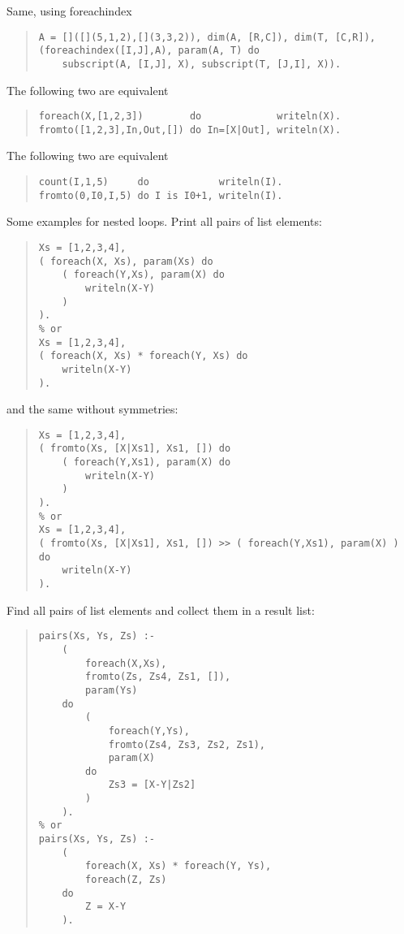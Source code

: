 Same, using foreachindex
\begin{quote}\begin{verbatim}
A = []([](5,1,2),[](3,3,2)), dim(A, [R,C]), dim(T, [C,R]),
(foreachindex([I,J],A), param(A, T) do
    subscript(A, [I,J], X), subscript(T, [J,I], X)).
\end{verbatim}\end{quote}

The following two are equivalent
\begin{quote}\begin{verbatim}
foreach(X,[1,2,3])        do             writeln(X).
fromto([1,2,3],In,Out,[]) do In=[X|Out], writeln(X).
\end{verbatim}\end{quote}

The following two are equivalent
\begin{quote}\begin{verbatim}
count(I,1,5)     do            writeln(I).
fromto(0,I0,I,5) do I is I0+1, writeln(I).
\end{verbatim}\end{quote}

Some examples for nested loops. Print all pairs of list elements:
\begin{quote}\begin{verbatim}
Xs = [1,2,3,4],
( foreach(X, Xs), param(Xs) do
    ( foreach(Y,Xs), param(X) do
        writeln(X-Y)
    )
).
% or
Xs = [1,2,3,4],
( foreach(X, Xs) * foreach(Y, Xs) do
    writeln(X-Y)
).
\end{verbatim}\end{quote}
and the same without symmetries:
\begin{quote}\begin{verbatim}
Xs = [1,2,3,4],
( fromto(Xs, [X|Xs1], Xs1, []) do
    ( foreach(Y,Xs1), param(X) do
        writeln(X-Y)
    )
).
% or
Xs = [1,2,3,4],
( fromto(Xs, [X|Xs1], Xs1, []) >> ( foreach(Y,Xs1), param(X) ) do
    writeln(X-Y)
).
\end{verbatim}\end{quote}
Find all pairs of list elements and collect them in a result list:
\begin{quote}\begin{verbatim}
pairs(Xs, Ys, Zs) :-
    (
        foreach(X,Xs),
        fromto(Zs, Zs4, Zs1, []),
        param(Ys)
    do
        (
            foreach(Y,Ys),
            fromto(Zs4, Zs3, Zs2, Zs1),
            param(X)
        do
            Zs3 = [X-Y|Zs2]
        )
    ).
% or
pairs(Xs, Ys, Zs) :-
    (
        foreach(X, Xs) * foreach(Y, Ys),
        foreach(Z, Zs)
    do
        Z = X-Y
    ).
\end{verbatim}\end{quote}

